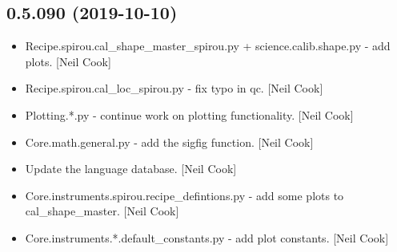 \documentclass[a4paper,10pt,english]{report}
\begin{document}
\subsection{0.5.090 (2019-10-10)}
\label{\detokenize{misc/changelog:id51}}\begin{itemize}
\item {} 
Recipe.spirou.cal\_shape\_master\_spirou.py + science.calib.shape.py -
add plots. {[}Neil Cook{]}

\item {} 
Recipe.spirou.cal\_loc\_spirou.py - fix typo in qc. {[}Neil Cook{]}

\item {} 
Plotting.*.py - continue work on plotting functionality. {[}Neil Cook{]}

\item {} 
Core.math.general.py - add the sigfig function. {[}Neil Cook{]}

\item {} 
Update the language database. {[}Neil Cook{]}

\item {} 
Core.instruments.spirou.recipe\_defintions.py - add some plots to
cal\_shape\_master. {[}Neil Cook{]}

\item {} 
Core.instruments.*.default\_constants.py - add plot constants. {[}Neil
Cook{]}

\end{itemize}
\end{document}
